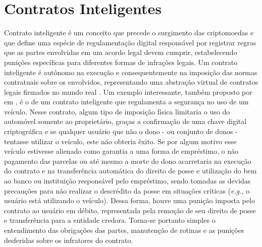 \section{Contratos Inteligentes}
\label{sec:blockchain:smart_contracts}
\acresetall

Contrato inteligente é um conceito que precede o surgimento das criptomoedas e que define uma espécie de regulamentação digital responsável por registrar regras que as partes envolvidas em um acordo legal devem cumprir, estabelecendo punições específicas para diferentes formas de infrações legais. Um contrato inteligente é autônomo na execução e consequentemente na imposição das normas contratuais sobre os envolvidos, representando uma abstração virtual de contratos legais firmados no mundo real \cite{smart_contracts:szabo}. Um exemplo interessante, também proposto por  \citeauthor{smart_contracts:szabo} em \citeyear{smart_contracts:szabo}, é o de um contrato inteligente que regulamenta a segurança no uso de um veículo. Nesse contrato, algum tipo de imposição física limitaria o uso do automóvel somente ao proprietário, graças a confirmação de uma chave digital criptográfica e se qualquer usuário que não o dono - ou conjunto de donos - tentasse utilizar o veículo, este não obteria êxito. Se por algum motivo esse veículo estivesse alienado como garantia a uma forma de empréstimo, o não pagamento das parcelas ou até mesmo a morte do dono acarretaria na execução do contrato e na transferência automática do direito de posse e utilização do bem ao banco ou instituição responsável pelo empréstimo, sendo tomadas as devidas precauções para não realizar o descrédito da posse em situações críticas (\textit{e.g.}, o usuário está utilizando o veículo). Dessa forma, houve uma punição imposta pelo contrato ao usuário em débito, representada pela remoção de seu direito de posse e transferência para a entidade credora. Torna-se portanto simples o entendimento das obrigações das partes, manutenção de rotinas e as punições desferidas sobre os infratores do contrato.


